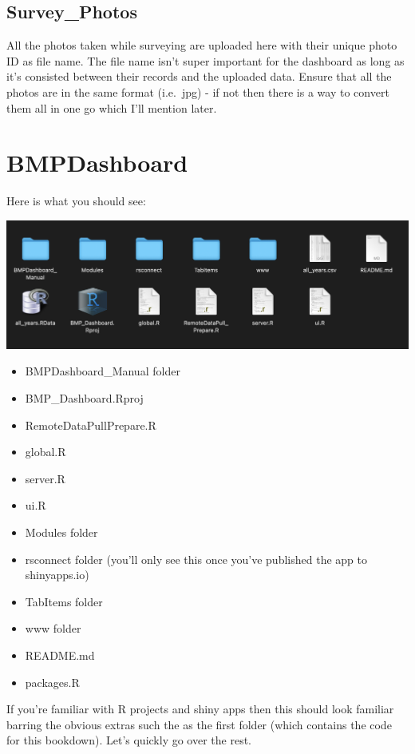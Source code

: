 \documentclass[
]{book}
\begin{document}
\hypertarget{survey_photos}{%
\subsection{Survey\_Photos}\label{survey_photos}}

All the photos taken while surveying are uploaded here with their unique photo ID as file name. The file name isn't super important for the dashboard as long as it's consisted between their records and the uploaded data. Ensure that all the photos are in the same format (i.e.~jpg) - if not then there is a way to convert them all in one go which I'll mention later.

\hypertarget{bmpdashboard}{%
\section{BMPDashboard}\label{bmpdashboard}}

Here is what you should see:

\includegraphics{images/BMPDashboard.png}

\begin{itemize}
\item
  BMPDashboard\_Manual folder
\item
  BMP\_Dashboard.Rproj
\item
  RemoteDataPullPrepare.R
\item
  global.R
\item
  server.R
\item
  ui.R
\item
  Modules folder
\item
  rsconnect folder (you'll only see this once you've published the app to shinyapps.io)
\item
  TabItems folder
\item
  www folder
\item
  README.md
\item
  packages.R
\end{itemize}

If you're familiar with R projects and shiny apps then this should look familiar barring the obvious extras such the as the first folder (which contains the code for this bookdown). Let's quickly go over the rest.
\end{document}
